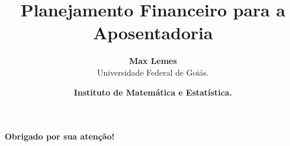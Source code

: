 \documentclass[aspectratio=1610,12pt]{beamer} %
\title
  {Planejamento Financeiro para a Aposentadoria}
\author[Max Lemes]
  {
   \textbf{Max Lemes} \\
   Universidade Federal de Goiás.
  }
\date
  {
    \textcolor{UFGorange}{\textbf{Instituto de Matemática e Estatística.}}\\
  }
\begin{document}
\maketitle


% 
% 
% 
% 
% 
% 
% 
% 
% 
% 



\begin{frame}[c]\frametitle{}
  \begin{center}
    \LARGE \textcolor{UFGblue}{\textbf{Obrigado por sua atenção!}}
  \end{center}
\end{frame}
\end{document}
